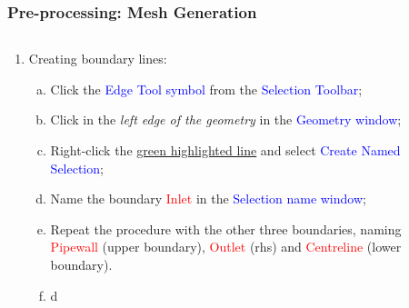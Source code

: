 \documentclass[10pt,compress]{beamer}
\newcommand{\red}{\textcolor{red}}
\newcommand{\blue}{\textcolor{blue}}
\begin{document}
 
\begin{frame}
 \frametitle{Pre-processing: Mesh Generation} 
    \begin{columns}
       \begin{column}[l]{0.5\linewidth}
          \begin{enumerate}\scriptsize\setcounter{enumi}{2}
             \item<1-> Creating boundary lines:
                \begin{enumerate}[a)]\scriptsize
                   \item<2-> Click the \blue{Edge Tool symbol} from the \blue{Selection Toolbar};
                   \item<2-> Click in the {\it left edge of the geometry} in the \blue{Geometry window};
                   \item<2-> Right-click the \underline{green highlighted line} and select \blue{Create Named Selection};
                   \item<2-> Name the boundary \red{Inlet} in the \blue{Selection name window};
                   \item<2-> Repeat the procedure with the other three boundaries, naming \red{Pipewall} (upper boundary), \red{Outlet} (rhs) and \red{Centreline} (lower boundary).
                   \item<2-> d
                \end{enumerate}
          \end{enumerate}
       \end{column}
       \begin{column}[l]{0.5\linewidth}
       \end{column}
    \end{columns}
\end{frame} 
\end{document}
